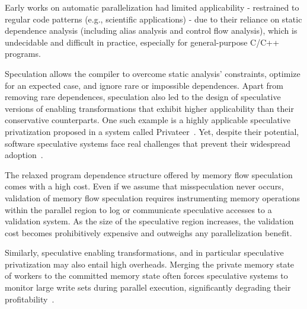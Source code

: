 Early works on automatic parallelization had limited applicability -
restrained to regular code patterns (e.g., scientific applications) -
due to their reliance on static dependence analysis (including alias
analysis and control flow analysis), which is undecidable and
difficult in practice, especially for general-purpose C/C++ programs.

Speculation allows the compiler to overcome static analysis'
constraints, optimize for an expected case, and ignore rare or
impossible dependences.  Apart from removing rare dependences,
speculation also led to the design of speculative versions of enabling
transformations that exhibit higher applicability than their
conservative counterparts.  One such example is a highly applicable
speculative privatization proposed in a system called
Privateer~\cite{johnson:12:pldi}.
%
Yet, despite their potential, software speculative systems face real
challenges that prevent their widespread
adoption~\cite{cascaval:08:stmtoy:short, .., ..}.
%

The relaxed program dependence structure offered by memory flow
speculation comes with a high cost.  Even if we assume that
misspeculation never occurs, validation of memory flow speculation
requires instrumenting memory operations within the parallel region to
log or communicate speculative accesses to a validation system. As the
size of the speculative region increases, the validation cost becomes
prohibitively expensive and outweighs any parallelization benefit.

Similarly, speculative enabling transformations, and
in particular speculative privatization may also entail high
overheads.  Merging the private memory state of workers to the
committed memory state often forces speculative systems to monitor
large write sets during parallel execution, significantly degrading
their profitability~\cite{kim:12:cgo,johnson:12:pldi}.

